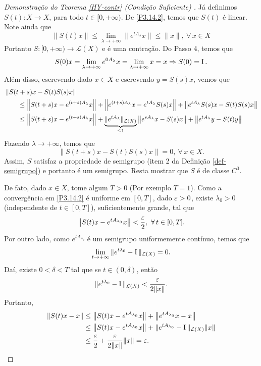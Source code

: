 \begin{proof}[Demonstração do Teorema {\ref{HY-contr}} (Condição Suficiente) ]
Já definimos $S(t):X\to X$, para todo $t\in [0,+\infty)$. De \eqref{P3.14.2}, 
temos que $S(t)$ é linear. Note ainda  que
\begin{equation*}
\|S(t)x\|\leq \lim\limits_{\lambda \to +\infty} \|e^{tA_\lambda}x\|\leq \|x\|,\ 
\forall\, x\in X
\end{equation*}
Portanto $S:[0,+\infty)\to \mathcal{L}(X)$ e é uma contração. Do Passo 4, temos 
que
\[
S(0)x=\lim_{\lambda \to +\infty} e^{0A_\lambda}x
=\lim_{\lambda \to +\infty} x= x\Rightarrow S(0)=\operatorname{I}.
\]
Além disso, escrevendo dado $x\in X$ e escrevendo $y=S(s)x$, vemos que
\begin{align*}
& \left\| S(t+s)x-S(t)S(s)x \right\| \\
& \qquad \leq \left\| S(t+s)x-e^{(t+s)A_\lambda}x \right\|
+\left\| e^{(t+s)A_\lambda}x - e^{tA_\lambda}S(s)x\right\|
+\left\|e^{tA_\lambda}S(s)x-S(t)S(s)x\right\|\\
& \qquad \leq \left\| S(t+s)x-e^{(t+s)A_\lambda}x \right\|
+\underbrace{\|e^{tA_\lambda}\|_{\mathcal{L}(X)}}_{\leq 1} \left\| e^{sA_\lambda}x - S(s)x\right\|
+\left\|e^{tA_\lambda}y-S(t)y\right\|
\end{align*}
Fazendo $\lambda \to +\infty$, temos que
\begin{equation*}
\left\| S(t+s)x-S(t)S(s)x \right\| = 0,\ \forall\, x\in X.
\end{equation*}
Assim, $S$ satisfaz a propriedade de semigrupo (item 2 da Definição 
\ref{def-semigrupo}) e portanto é um semigrupo. Resta mostrar que $S$ é de classe 
$C^0$. 

De fato, dado $x\in X$, tome algum $T>0$ (Por exemplo $T=1$). Como a convergência em 
\eqref{P3.14.2} é uniforme em $[0,T]$, dado $\varepsilon>0$, existe $\lambda_0>0$
(independente de $t\in [0,T]$), suficientemente grande, tal que 
\begin{equation*}
\left\|S(t)x-e^{tA_{\lambda_0}}x \right\|< \frac{\varepsilon}{2},\ \forall\, t\in [0,T].
\end{equation*}
Por outro lado, como $e^{tA_{\lambda_0}}$ é um semigrupo uniformemente contínuo, temos que 
\begin{equation*}
\lim\limits_{t\to +\infty} \|e^{t\lambda_0}-\operatorname{I}\|_{\mathcal{L}(X)}=0.
\end{equation*}
Daí, existe $0<\delta<T$ tal que se $t\in (0,\delta)$, então
\begin{equation*}
\|e^{t\lambda_0}-\operatorname{I}\|_{\mathcal{L}(X)}<\frac{\varepsilon}{2\|x\|}.
\end{equation*}
Portanto,
\begin{align*}
\left\|S(t)x-x \right\|
& \leq
 \left\|S(t)x-e^{tA_{\lambda_0}}x \right\| 
+\left\|e^{tA_{\lambda_0}}x - x\right\|\\
&\leq  \left\|S(t)x-e^{tA_{\lambda_0}}x \right\|
 + \|e^{tA_{\lambda_0}}- \operatorname{I}\|_{\mathcal{L}(X)}\|x\|\\
&\leq  \frac{\varepsilon}{2}+\frac{\varepsilon}{2\|x\|}\|x\|=\varepsilon.
\end{align*}



\end{proof}
